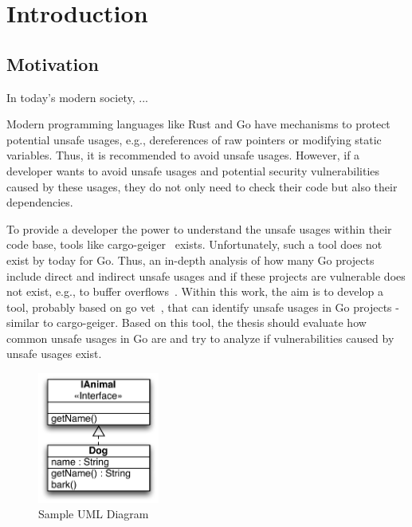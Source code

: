 
\chapter{Introduction}\label{ch:introduction}



\section{Motivation}\label{sec:motivation}

In today's modern society, ...

Modern programming languages like Rust and Go have mechanisms to protect potential
unsafe usages, e.g., dereferences of raw pointers or modifying static variables. Thus, it is
recommended to avoid unsafe usages. However, if a developer wants to avoid unsafe
usages and potential security vulnerabilities caused by these usages, they do not only need
to check their code but also their dependencies.

To provide a developer the power to understand the unsafe usages within their code base,
tools like cargo-geiger~\cite{cargogeiger} exists. Unfortunately, such a tool does not exist by today for Go.
Thus, an in-depth analysis of how many Go projects include direct and indirect unsafe
usages and if these projects are vulnerable does not exist, e.g., to buffer overflows~\cite{larochelle2001, alnaeli2017, wang2020}.
Within this work, the aim is to develop a tool, probably based on go vet~\cite{govet}, that can identify
unsafe usages in Go projects - similar to cargo-geiger. Based on this tool, the thesis should
evaluate how common unsafe usages in Go are and try to analyze if vulnerabilities caused
by unsafe usages exist.

\begin{figure}
    \centering
    \includegraphics[width=4cm]{assets/images/uml}
    \caption{Sample UML Diagram}
    \label{fig:uml_example}
\end{figure}



